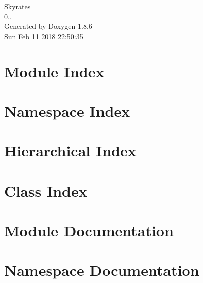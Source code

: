 \documentclass[twoside]{book}
\newcommand{\clearemptydoublepage}{%
  \newpage{\pagestyle{empty}\cleardoublepage}%
}
\begin{document}
\hypersetup{pageanchor=false}
\begin{titlepage}
\vspace*{7cm}
\begin{center}%
{\Large Skyrates \\[1ex]\large 0.. }\\
\vspace*{1cm}
{\large Generated by Doxygen 1.8.6}\\
\vspace*{0.5cm}
{\small Sun Feb 11 2018 22:50:35}\\
\end{center}
\end{titlepage}
\clearemptydoublepage
\tableofcontents
\clearemptydoublepage
{}
\hypersetup{pageanchor=true}

\chapter{Module Index}

\chapter{Namespace Index}

\chapter{Hierarchical Index}

\chapter{Class Index}

\chapter{Module Documentation}




\chapter{Namespace Documentation}





















\end{document}
